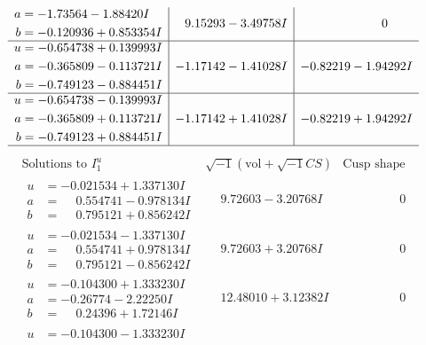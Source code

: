 \documentclass[1p]{elsarticle_modified}
\theoremstyle{definition}
\newcommand{\I}{\sqrt{-1}}
\begin{document}
$$\begin{array}{c|c|c}
\begin{aligned}
a &= -1.73564 - 1.88420 I \\
b &= -0.120936 + 0.853354 I\end{aligned}
 & \phantom{-}9.15293 - 3.49758 I & \phantom{-0.000000 } 0 \\ \hline\begin{aligned}
u &= -0.654738 + 0.139993 I \\
a &= -0.365809 - 0.113721 I \\
b &= -0.749123 - 0.884451 I\end{aligned}
 & -1.17142 - 1.41028 I & -0.82219 - 1.94292 I \\ \hline\begin{aligned}
u &= -0.654738 - 0.139993 I \\
a &= -0.365809 + 0.113721 I \\
b &= -0.749123 + 0.884451 I\end{aligned}
 & -1.17142 + 1.41028 I & -0.82219 + 1.94292 I\\
 \hline 
 \end{array}$$\newpage$$\begin{array}{c|c|c}  
\text{Solutions to }I^u_{1}& \I (\text{vol} + \sqrt{-1}CS) & \text{Cusp shape}\\
 \hline 
\begin{aligned}
u &= -0.021534 + 1.337130 I \\
a &= \phantom{-}0.554741 - 0.978134 I \\
b &= \phantom{-}0.795121 + 0.856242 I\end{aligned}
 & \phantom{-}9.72603 - 3.20768 I & \phantom{-0.000000 } 0 \\ \hline\begin{aligned}
u &= -0.021534 - 1.337130 I \\
a &= \phantom{-}0.554741 + 0.978134 I \\
b &= \phantom{-}0.795121 - 0.856242 I\end{aligned}
 & \phantom{-}9.72603 + 3.20768 I & \phantom{-0.000000 } 0 \\ \hline\begin{aligned}
u &= -0.104300 + 1.333230 I \\
a &= -0.26774 - 2.22250 I \\
b &= \phantom{-}0.24396 + 1.72146 I\end{aligned}
 & \phantom{-}12.48010 + 3.12382 I & \phantom{-0.000000 } 0 \\ \hline\begin{aligned}
u &= -0.104300 - 1.333230 I \\

\end{aligned}
\end{array}$$
\end{document}
